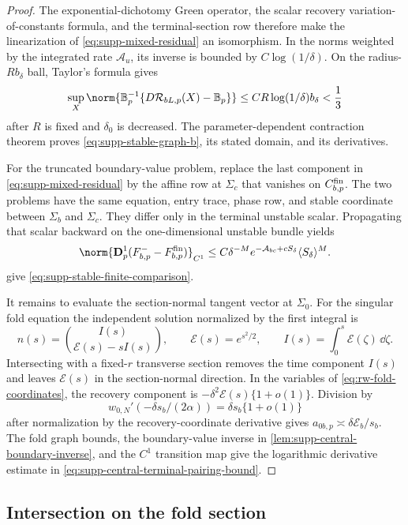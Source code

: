 \begin{proof}
The exponential-dichotomy Green operator, the scalar recovery
variation-of-constants formula, and the terminal-section row therefore make the
linearization of \cref{eq:supp-mixed-residual} an isomorphism.  In the
norms weighted by the integrated rate \(\mathcal A_u\), its inverse is bounded by
\(C\log(1/\delta)\).  On the radius-\(Rb_\delta\) ball, Taylor's formula
gives
\[
 \sup_X\norm{\mathbb B_p^{-1}
       \{D\mathcal R_{bL,p}(X)-\mathbb B_p\}}
 \le CR\log(1/\delta)b_\delta<\frac13
\]
after \(R\) is fixed and \(\delta_0\) is decreased.  The
parameter-dependent contraction theorem proves
\cref{eq:supp-stable-graph-b}, its stated domain, and its derivatives.

For the truncated boundary-value problem, replace the last component in
\cref{eq:supp-mixed-residual} by the affine row at \(\Sigma_c\) that
vanishes on \(C_{b,p}^{\rm fin}\).  The two problems have the same
equation, entry trace, phase row, and stable coordinate between
\(\Sigma_b\) and \(\Sigma_c\).  They differ only in the terminal unstable
scalar.  Propagating that scalar backward on the one-dimensional unstable
bundle yields
\[
 \norm{\mathbf D_p^1(F_{b,p}^--F_{b,p}^{\rm fin})}_{C^1}
 \le C\delta^{-M}e^{-\mathcal A_{bc}+cS_\delta}
       \langle S_\delta\rangle^M.
\]
give \cref{eq:supp-stable-finite-comparison}.

It remains to evaluate the section-normal tangent vector at \(\Sigma_0\).  For
the singular fold equation
the independent solution normalized by the first integral is
\[
 n(s)=\binom{I(s)}{\mathcal E(s)-sI(s)},\qquad
 \mathcal E(s)=e^{s^2/2},\qquad
 I(s)=\int_0^s\mathcal E(\zeta)\,\dd\zeta.
\]
Intersecting with a fixed-\(r\) transverse section removes the time component
\(I(s)\) and leaves
\(\mathcal E(s)\) in the section-normal direction.  In the variables of
\cref{eq:rw-fold-coordinates}, the recovery component is
\(-\delta^2\mathcal E(s)\{1+o(1)\}\).  Division by
\[
 w_{0,N}'(-\delta s_b/(2\alpha))
 =\delta s_b\{1+o(1)\}
\]
after normalization by the recovery-coordinate derivative gives
\(a_{0b,p}\asymp\delta\mathcal E_b/s_b\).  The fold graph bounds, the
boundary-value inverse in \cref{lem:supp-central-boundary-inverse}, and the
\(C^1\) transition map give the logarithmic derivative estimate in
\cref{eq:supp-central-terminal-pairing-bound}.
\end{proof}

\subsection{Intersection on the fold section}

